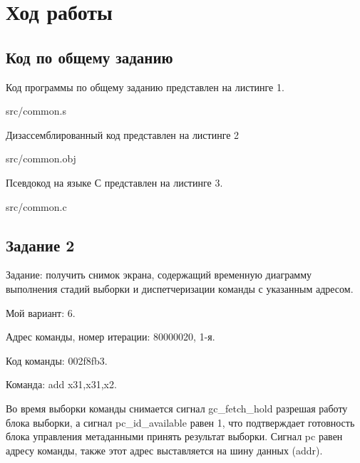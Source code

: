 \chapter*{Ход работы}

\section*{Код по общему заданию}
Код программы по общему заданию представлен на листинге 1.

\FloatBarrier
\begin{lstinputlisting}[caption=Код общего задания, 
	linerange={1, 33}, basicstyle=\footnotesize\ttfamily, frame=single, breaklines=true]{src/common.s}
\end{lstinputlisting}
\FloatBarrier

Дизассемблированный код представлен на листинге 2

\FloatBarrier
\begin{lstinputlisting}[caption=Дизассемблированный код общего задания, 
	linerange={1, 41}, basicstyle=\footnotesize\ttfamily, frame=single, breaklines=true]{src/common.obj}
\end{lstinputlisting}
\FloatBarrier

Псевдокод на языке С представлен на листинге 3.
\FloatBarrier
\begin{lstinputlisting}[caption=Псевдокод общего задания, 
	linerange={1, 24}, basicstyle=\footnotesize\ttfamily, frame=single, breaklines=true]{src/common.c}
\end{lstinputlisting}
\FloatBarrier

\section*{Задание 2}

Задание: получить снимок экрана, содержащий временную диаграмму выполнения стадий выборки и диспетчеризации команды с указанным адресом.

Мой вариант: 6. 

Адрес команды, номер итерации: 80000020, 1-я.

Код команды: 002f8fb3.

Команда: add x31,x31,x2.


Во время выборки команды снимается сигнал gc\_fetch\_hold разрешая работу блока выборки, а сигнал pc\_id\_available равен 1,
что подтверждает готовность блока управления метаданными принять результат выборки. 
Сигнал pc равен адресу команды, также этот адрес выставляется на шину данных (addr).

